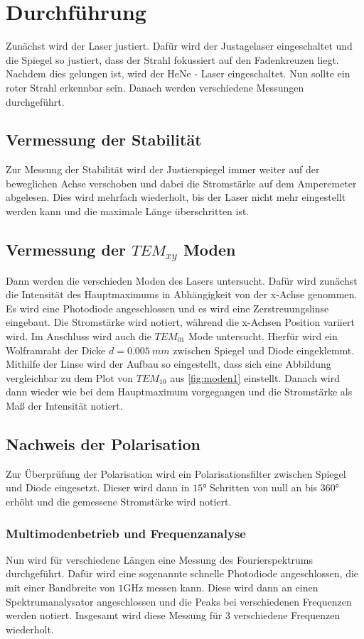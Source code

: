\section{Durchführung}
\label{sec:Durchführung}

Zunächst wird der Laser justiert.
Dafür wird der Justagelaser eingeschaltet und die Spiegel so justiert, dass der Strahl fokussiert auf den Fadenkreuzen liegt.
Nachdem dies gelungen ist, wird der HeNe - Laser eingeschaltet.
Nun sollte ein roter Strahl erkennbar sein.
Danach werden verschiedene Messungen durchgeführt.

\subsection*{Vermessung der Stabilität}
Zur Messung der Stabilität wird der Justierspiegel immer weiter auf der beweglichen Achse verschoben und dabei die Stromstärke auf dem Amperemeter abgelesen.
Dies wird mehrfach wiederholt, bis der Laser nicht mehr eingestellt werden kann und die maximale Länge überschritten ist.

\subsection*{Vermessung der $TEM_{xy}$ Moden}
Dann werden die verschieden Moden des Lasers untersucht.
Dafür wird zunächst die Intensität des Hauptmaximums in Abhängigkeit von der x-Achse genommen.
Es wird eine Photodiode angeschlossen und es wird eine Zerstreuungslinse eingebaut.
Die Stromstärke wird notiert, während die x-Achsen Position variiert wird.
Im Anschluss wird auch die $TEM_{01}$ Mode untersucht.
Hierfür wird ein Wolframraht der Dicke $d = \qty{0.005}{mm}$ zwischen Spiegel und Diode eingeklemmt.
Mithilfe der Linse wird der Aufbau so eingestellt, dass sich eine Abbildung vergleichbar zu dem Plot von $TEM_{10}$ aus \autoref{fig:moden1} einstellt.
Danach wird dann wieder wie bei dem Hauptmaximum vorgegangen und die Stromstärke als Maß der Intensität notiert.

\subsection*{Nachweis der Polarisation}
Zur Überprüfung der Polarisation wird ein Polarisationsfilter zwischen Spiegel und Diode eingesetzt.
Dieser wird dann in $15°$ Schritten von null an bis $360°$ erhöht und die gemessene Stromstärke wird notiert.

\subsubsection*{Multimodenbetrieb und Frequenzanalyse}
Nun wird für verschiedene Längen eine Messung des Fourierspektrums durchgeführt.
Dafür wird eine sogenannte schnelle Photodiode angeschlossen, die mit einer Bandbreite von $1 \unit{\giga\hertz}$ messen kann.
Diese wird dann an einen Spektrumanalysator angeschlossen und die Peaks bei verschiedenen Frequenzen werden notiert.
Insgesamt wird diese Messung für 3 verschiedene Frequenzen wiederholt.

